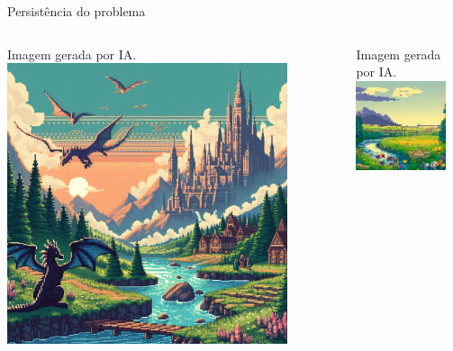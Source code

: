 \documentclass[compress,12pt]{beamer}
\begin{document}
\begin{frame}{Persistência do problema}
	\begin{columns}
		\begin{column}{0.5\textwidth}  %
			\begin{center}
                {Imagem gerada por IA.}    
				\includegraphics[width=0.85\textwidth]{Images/aiGeneratedPixelArt-2.jpg}
			\end{center}
		\end{column}
		\begin{column}{0.5\textwidth}  %
			\begin{center}
                {Imagem gerada por IA.}    
				\includegraphics[width=0.85\textwidth]{Images/aiGeneratedPixelArt-3.jpg}
			\end{center}
		\end{column}
	\end{columns}
\end{frame}
\end{document}
